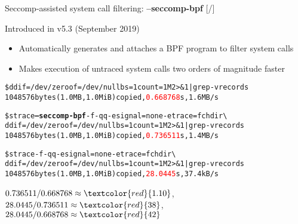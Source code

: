 \documentclass[unicode,aspectratio=169]{beamer}
\begin{document}
\begin{frame}[fragile]{Seccomp-assisted system call filtering: \textbf{--seccomp-bpf} \hfill [\insertframenumber/\inserttotalframenumber]}
\begin{block}{Introduced in v5.3 (September 2019)}
\begin{itemize}
\item Automatically generates and attaches a BPF program to filter system calls
\item Makes execution of untraced system calls two orders of magnitude faster
\end{itemize}
\end{block}

\begin{alltt}
\$ dd if=/dev/zero of=/dev/null bs=1 count=1M 2>\&1 | grep -v records
1048576 bytes (1.0 MB, 1.0 MiB) copied, \textcolor{red}{0.668768} s, 1.6 MB/s

\$ strace \textbf{--seccomp-bpf} -f -qq -e signal=none -e trace=fchdir {\textbackslash}
  dd if=/dev/zero of=/dev/null bs=1 count=1M 2>\&1 | grep -v records
1048576 bytes (1.0 MB, 1.0 MiB) copied, \textcolor{red}{0.736511} s, 1.4 MB/s

\$ strace -f -qq -e signal=none -e trace=fchdir {\textbackslash}
  dd if=/dev/zero of=/dev/null bs=1 count=1M 2>\&1 | grep -v records
1048576 bytes (1.0 MB, 1.0 MiB) copied, \textcolor{red}{28.0445} s, 37.4 kB/s
\end{alltt}

$0.736511 / 0.668768 \approx \textcolor{red}{1.10}$, $28.0445 / 0.736511 \approx \textcolor{red}{38}$, $28.0445 / 0.668768 \approx \textcolor{red}{42}$
\end{frame}
\end{document}
